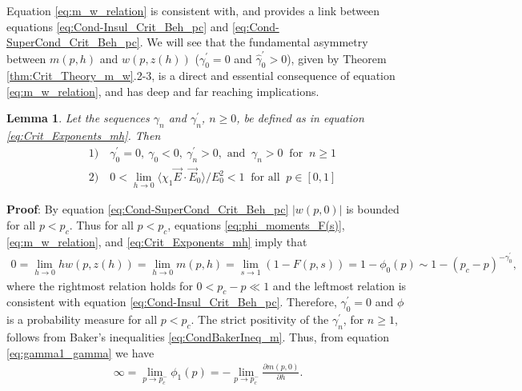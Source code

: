 \documentclass[english,12pt,jmp,graphicx]{revtex4-1}
\newtheorem{lemma}{Lemma}[section]
\newcommand{\gh}{\hat{\gamma}}
\begin{document}
Equation \eqref{eq:m_w_relation} is consistent with, and provides a
link between equations \eqref{eq:Cond-Insul_Crit_Beh_pc} and
\eqref{eq:Cond-SuperCond_Crit_Beh_pc}. We will see that the
fundamental asymmetry  between $m(p,h)$ and $w(p,z(h))$ ($\gamma_0^\prime=0$ and
$\gh_0^\prime>0$), given by Theorem \ref{thm:Crit_Theory_m_w}.2-3, is a
direct and essential consequence of equation \eqref{eq:m_w_relation},
and has deep and far reaching implications.      
%
\begin{lemma}\label{lem:zero_gamma0}
  Let the sequences $\gamma_n$ and $\gamma_n^\prime$, $n\geq0$, be defined as in
  equation \eqref{eq:Crit_Exponents_mh}. Then
  \begin{align*}
    &1) \quad \gamma_0^\prime=0, \ \gamma_0<0, \ \gamma_n^\prime>0,   \text{ and } \ \gamma_n>0 \
        \text{ for } \ n\geq1 \\
    &2) \quad 0<\lim_{h\to0}\langle\chi_1\vec{E}\cdot\vec{E}_0\rangle/E_0^2<1 \
         \text{ for all } \ p\in[0,1]
  \end{align*}
\end{lemma}
%
\noindent \textbf{Proof}:
%
By equation \eqref{eq:Cond-SuperCond_Crit_Beh_pc} $|w(p,0)|$ is  
bounded for all $p<p_c$. Thus for all $p<p_c$, equations
\eqref{eq:phi_moments_F(s)}, \eqref{eq:m_w_relation},
and \eqref{eq:Crit_Exponents_mh} imply that
%
\begin{align*}
  0=\lim_{h\to0}hw(p,z(h))=\lim_{h\to0}m(p,h)=\lim_{s\to1}(1-F(p,s))=1-\phi_0(p)\sim1-(p_c-p)^{-\gamma_0^\prime},
\end{align*}
%
where the rightmost relation holds for $0<p_c-p\ll1$ and the leftmost
relation is consistent with equation
\eqref{eq:Cond-Insul_Crit_Beh_pc}. Therefore, $\gamma_0^\prime=0$ and $\phi$ is a
probability measure for all $p<p_c$. The strict positivity of the
$\gamma_n^\prime$, for $n\geq1$, follows from Baker's inequalities
\eqref{eq:CondBakerIneq_m}. Thus, from equation
\eqref{eq:gamma1_gamma} we have 
%
\begin{align}\label{eq:div_phi1}
  \infty=\lim_{p\to p_c^-}\phi_1(p)=-\lim_{p\to p_c^-}\frac{\partial m(p,0)}{\partial h}.
\end{align}
%
\end{document}

